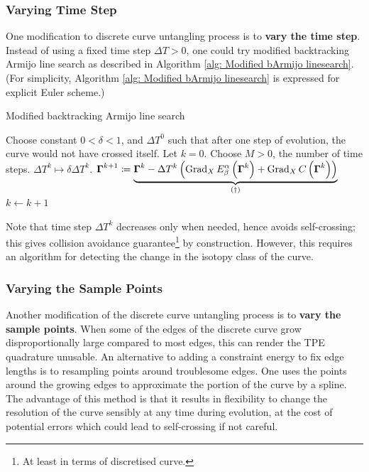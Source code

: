 \documentclass[../dissertation.tex]{subfiles}
\begin{document}
\subsubsection{Varying Time Step}
One modification to discrete curve untangling process is to \textbf{vary the time step}.
Instead of using a fixed time step $\Delta T > 0$, one could try modified backtracking Armijo line search\cite{doi:10.1137/1.9781611971200.ch6} as described in Algorithm \ref{alg: Modified bArmijo linesearch}.
(For simplicity, Algorithm \ref{alg: Modified bArmijo linesearch} is expressed for explicit Euler scheme.)
\begin{algorithm}[tbp]
    \caption{Modified backtracking Armijo line search}
    \label{alg: Modified bArmijo linesearch}
    \begin{algorithmic}
        \State Choose constant $0 < \delta < 1$, and $\Delta T^0$ such that after one step of evolution, the curve would not have crossed itself.
        \State Let $k = 0$.
        \State Choose $M > 0$, the number of time steps.
            \State $\Delta T^k \mapsto \delta \Delta T^k$.
            \Else
            \State $\boldsymbol{\Gamma}^{k+1} \coloneqq \underbrace{\boldsymbol{\Gamma}^k - \Delta T^k \left( \operatorname{Grad}_X E_{\beta}^{\alpha} \left( \boldsymbol{\Gamma}^k \right) + \operatorname{Grad}_X C \left( \boldsymbol{\Gamma}^k \right)\right)}_{(\dag)}$
            \State $k \leftarrow k + 1$
            \EndIf
        \EndWhile
    \end{algorithmic}
\end{algorithm}
Note that time step $\Delta T^k$ decreases only when needed, hence avoids self-crossing;
this gives collision avoidance guarantee\footnote{At least in terms of discretised curve.} by construction\cite{YSC2021}.
However, this requires an algorithm for detecting the change in the isotopy class of the curve.

\subsubsection{Varying the Sample Points}
Another modification of the discrete curve untangling process is to \textbf{vary the sample points}.
When some of the edges of the discrete curve grow disproportionally large compared to most edges,
this can render the TPE quadrature unusable.
An alternative to adding a constraint energy to fix edge lengths is to resampling points around troublesome edges.
One uses the points around the growing edges to approximate the portion of the curve by a spline. The advantage of this method is that it results in flexibility to change the resolution of the curve sensibly at any time during evolution, at the cost of potential errors which could lead to self-crossing if not careful.
\end{document}
